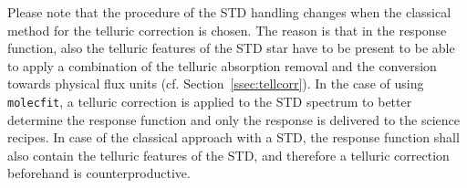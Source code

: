 
Please note that the procedure of the \ac{STD} handling changes when the classical method for the telluric correction is chosen. The reason is that in the response function, also the telluric features of the \ac{STD} star have to be present to be able to apply a combination of the telluric absorption removal and the conversion towards physical flux units (cf. Section~\ref{ssec:tellcorr}). In the case of using \texttt{molecfit}, a telluric correction is applied to the \ac{STD} spectrum to better determine the response function and only the response is delivered to the science recipes. In case of the classical approach with a \ac{STD}, the response function shall also contain the telluric features of the \ac{STD}, and therefore a telluric correction beforehand is counterproductive.\\


